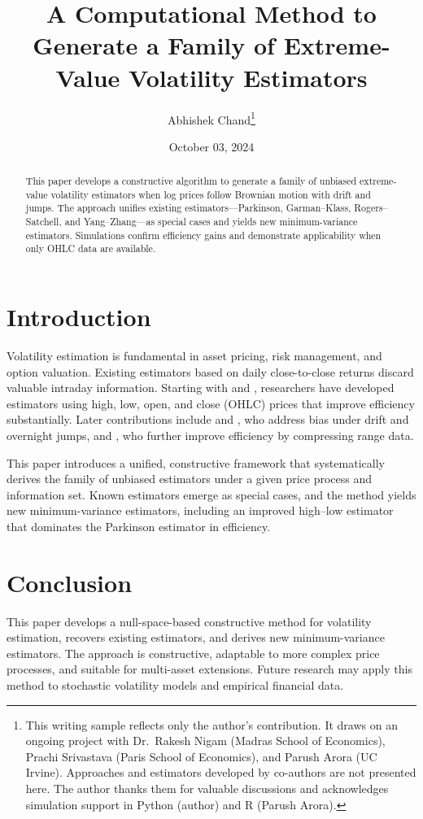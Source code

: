 \documentclass[12pt]{article}
\title{\textbf{A Computational Method to Generate a Family of Extreme-Value Volatility Estimators}}
\author{Abhishek Chand\thanks{This writing sample reflects only the author’s contribution. It draws on an ongoing project with Dr.\ Rakesh Nigam (Madras School of Economics), Prachi Srivastava (Paris School of Economics), and Parush Arora (UC Irvine). Approaches and estimators developed by co-authors are not presented here. The author thanks them for valuable discussions and acknowledges simulation support in Python (author) and R (Parush Arora).}}
\date{October 03, 2024}
\begin{document}
\maketitle

\begin{abstract}
This paper develops a constructive algorithm to generate a family of unbiased extreme-value volatility estimators when log prices follow Brownian motion with drift and jumps. The approach unifies existing estimators---Parkinson, Garman--Klass, Rogers--Satchell, and Yang--Zhang---as special cases and yields new minimum-variance estimators. Simulations confirm efficiency gains and demonstrate applicability when only OHLC data are available.
\end{abstract}

\section{Introduction}
Volatility estimation is fundamental in asset pricing, risk management, and option valuation. Existing estimators based on daily close-to-close returns discard valuable intraday information. Starting with \citet{parkinson1980ExtremeValueMethod} and \citet{garman1980EstimationSecurityPrice}, researchers have developed estimators using high, low, open, and close (OHLC) prices that improve efficiency substantially. Later contributions include \citet{rogers1991EstimatingVarianceHigh} and \citet{yang2000DriftIndependentVolatilityEstimation}, who address bias under drift and overnight jumps, and \citet{meilijson2009GarmanKlassVolatilityEstimator}, who further improve efficiency by compressing range data.

This paper introduces a unified, constructive framework that systematically derives the family of unbiased estimators under a given price process and information set. Known estimators emerge as special cases, and the method yields new minimum-variance estimators, including an improved high--low estimator that dominates the Parkinson estimator in efficiency.

\section{Conclusion}
This paper develops a null-space-based constructive method for volatility estimation, recovers existing estimators, and derives new minimum-variance estimators. The approach is constructive, adaptable to more complex price processes, and suitable for multi-asset extensions. Future research may apply this method to stochastic volatility models and empirical financial data.


\end{document}
